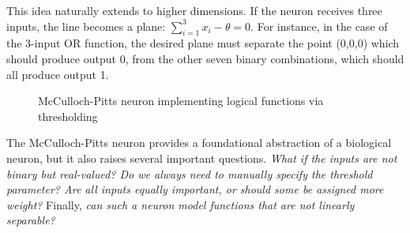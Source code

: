 This idea naturally extends to higher dimensions. If the neuron receives three inputs, the line becomes a plane: $\sum_{i=1}^3 x_i - \theta = 0$. For instance, in the case of the 3-input OR function, the desired plane must separate the point (0,0,0) which should produce output 0, from the other seven binary combinations, which should all produce output 1.

\begin{figure}[h]
    \centering
    \hspace{80pt}
    \caption{McCulloch-Pitts neuron implementing logical functions via thresholding}
\end{figure}

The McCulloch-Pitts neuron provides a foundational abstraction of a biological neuron, but it also raises several important questions. \textit{What if the inputs are not binary but real-valued? Do we always need to manually specify the threshold parameter? Are all inputs equally important, or should some be assigned more weight?} Finally, \textit{can such a neuron model functions that are not linearly separable?}
